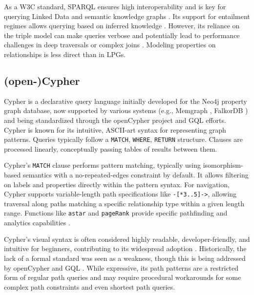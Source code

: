 \documentclass[sigconf,natbib=false]{acmart}
\begin{document}
As a W3C standard, SPARQL ensures high interoperability and is key for querying Linked Data and semantic knowledge graphs \cite{khanKnowledgeGraphsQuerying,ali2021SurveyRDFStores}.
Its support for entailment regimes allows querying based on inferred knowledge \cite{RDF11Semantics}.
However, its reliance on the triple model can make queries verbose and potentially lead to performance challenges in deep traversals or complex joins \cite{abreuChoosingGraphDatabases}.
Modeling properties on relationships is less direct than in LPGs.

\subsection{(open-)Cypher}
Cypher \cite{IntroductionCypherManual} is a declarative query language initially developed for the Neo4j \cite{2025Neo4jGraphDatabase} property graph database, now supported by various systems (e.g., Memgraph \cite{Memgraph}, FalkorDB \cite{2025FalkorDBGraphDatabase}) and being standardized through the openCypher project \cite{OpenCypherOpenCypher} and GQL \cite{ISOIECGQL} efforts.
Cypher is known for its intuitive, ASCII-art syntax for representing graph patterns. %
Queries typically follow a \texttt{MATCH}, \texttt{WHERE}, \texttt{RETURN} structure.
Clauses are processed linearly, conceptually passing tables of results between them.

Cypher's \texttt{MATCH} clause performs pattern matching, typically using isomorphism-based semantics with a no-repeated-edges constraint by default.
It allows filtering on labels and properties directly within the pattern syntax.
For navigation, Cypher supports variable-length path specifications like \texttt{-[*3..5]->}, allowing traversal along paths matching a specific relationship type within a given length range.
Functions like \texttt{astar} and \texttt{pageRank} provide specific pathfinding and analytics capabilities \cite{IntroductionCypherManual}.

Cypher's visual syntax is often considered highly readable, developer-friendly, and intuitive for beginners, contributing to its widespread adoption \cite{francis2018CypherEvolvingQuery}.
Historically, the lack of a formal standard was seen as a weakness, though this is being addressed by openCypher \cite{OpenCypherOpenCypher} and GQL \cite{ISOIECGQL}.
While expressive, its path patterns are a restricted form of regular path queries and may require procedural workarounds for some complex path constraints and even shortest path queries. %
\end{document}
